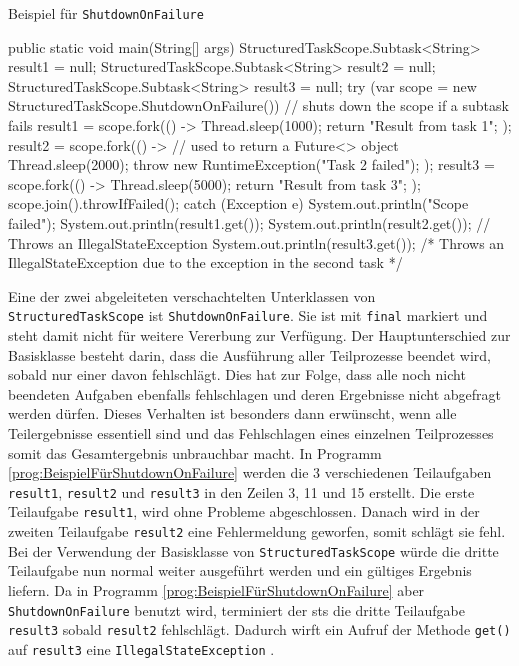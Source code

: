     \begin{program} [H]
        \caption{Beispiel für \texttt{ShutdownOnFailure}}
        \label{prog:BeispielFürShutdownOnFailure}
    \begin{JavaCode}[language=Java, numbers=left]
public static void main(String[] args) {
    StructuredTaskScope.Subtask<String> result1 = null;
    StructuredTaskScope.Subtask<String> result2 = null;
    StructuredTaskScope.Subtask<String> result3 = null;
    try (var scope = new StructuredTaskScope.ShutdownOnFailure()) {            
                                          // shuts down the scope if a subtask fails
        result1 = scope.fork(() -> {
            Thread.sleep(1000);
            return "Result from task 1";
        });
        result2 = scope.fork(() -> {      // used to return a Future<> object
            Thread.sleep(2000);
            throw new RuntimeException("Task 2 failed");
        });
        result3 = scope.fork(() -> {
            Thread.sleep(5000);
            return "Result from task 3";
        });
        scope.join().throwIfFailed();
    } catch (Exception e) {
        System.out.println("Scope failed");
    }
    System.out.println(result1.get());                                          
    System.out.println(result2.get());    // Throws an IllegalStateException
    System.out.println(result3.get());    /* Throws an IllegalStateException due
                                             to the exception in the second task */
}\end{JavaCode}
    \end{program}
    Eine der zwei abgeleiteten verschachtelten Unterklassen von \texttt{StructuredTaskScope} ist \texttt{ShutdownOnFailure}. Sie ist mit \texttt{final} markiert und steht damit nicht für weitere
    Vererbung zur Verfügung. Der Hauptunterschied zur Basisklasse besteht darin, dass die Ausführung aller Teilprozesse beendet wird, sobald nur einer davon fehlschlägt.
    Dies hat zur Folge, dass alle noch nicht beendeten Aufgaben ebenfalls fehlschlagen und deren Ergebnisse nicht abgefragt werden dürfen. Dieses Verhalten ist besonders dann
    erwünscht, wenn alle Teilergebnisse essentiell sind und das Fehlschlagen eines einzelnen Teilprozesses somit das Gesamtergebnis unbrauchbar macht. In Programm \ref{prog:BeispielFürShutdownOnFailure} werden 
    die 3 verschiedenen Teilaufgaben \texttt{result1}, \texttt{result2} und \texttt{result3} in den Zeilen 3, 11 und 15 erstellt. Die erste Teilaufgabe \texttt{result1}, wird ohne Probleme abgeschlossen.
    Danach wird in der zweiten Teilaufgabe \texttt{result2}
    eine Fehlermeldung geworfen, somit schlägt sie fehl. Bei der Verwendung der Basisklasse von \texttt{StructuredTaskScope} würde die dritte Teilaufgabe nun normal weiter ausgeführt werden und ein gültiges 
    Ergebnis liefern. Da in Programm \ref{prog:BeispielFürShutdownOnFailure} aber \texttt{ShutdownOnFailure} benutzt wird, terminiert der \gls{sts} die dritte Teilaufgabe \texttt{result3}  sobald \texttt{result2}
    fehlschlägt. Dadurch wirft ein Aufruf der Methode \texttt{get()} auf \texttt{result3} eine \texttt{IllegalStateException} \cite{ShutdownOnFailure}.


